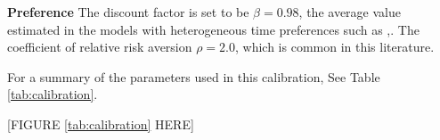 \textbf{Preference} The discount factor is set to be $\beta=0.98$, the average value estimated in the models with heterogeneous time preferences such as \cite{carroll2017distribution},\cite{krueger2016macroeconomics}. The coefficient of relative risk aversion $\rho=2.0$, which is common in this literature. 

For a summary of the parameters used in this calibration, See Table \ref{tab:calibration}. 

\begin{center}
[FIGURE \ref{tab:calibration} HERE]
\end{center}